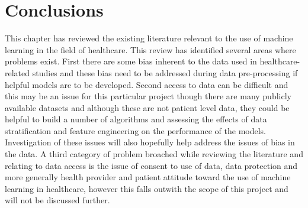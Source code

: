 \section{Conclusions}

This chapter has reviewed the existing literature relevant to the use of machine learning in the field of healthcare. This review has identified several areas where problems exist. \newline 
First there are some bias inherent to the data used in healthcare-related studies and these bias need to be addressed during data pre-processing if helpful models are to be developed.\newline
Second access to data can be difficult and this may be an issue for this particular project though there are many publicly available datasets and although these are not patient level data, they could be helpful to build a number of algorithms and assessing the effects of data stratification and feature engineering on the performance of the models. Investigation of these issues will also hopefully help address the issues of bias in the data.\newline
A third category of problem broached while reviewing the literature and relating to data access is the issue of consent to use of data, data protection and more generally health provider and patient attitude toward the use of machine learning in healthcare, however this falls outwith the scope of this project and will not be discussed further. 




